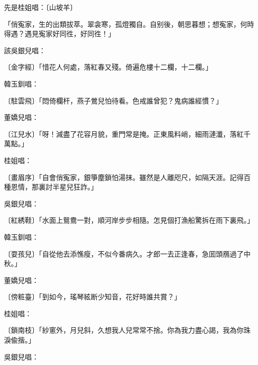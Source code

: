 先是桂姐唱：〔山坡羊〕
\begin{myquote}
「俏寃家，生的出類拔萃。翠衾寒，孤燈獨自。自别後，朝思暮想；想寃家，何時得遇？遇見寃家好同徃，好同徃！」
\end{myquote}

該吳銀兒唱：

\begin{myquote}
{\markfont〔金字經〕}「惜花人何處，落紅春又殘。倚遍危樓十二欄，十二欄。」
\end{myquote}

韓玉釧唱：

\begin{myquote}
{\markfont〔駐雲飛〕}「悶倚欄杆，燕子鶯兒怕待看。色戒誰曾犯？鬼病誰經慣？」
\end{myquote}

董嬌兒唱：

\begin{myquote}
{\markfont〔江兒水〕}「呀！減盡了花容月貌，重門常是掩。正東風料峭，細雨漣瀸，落紅千萬點。」
\end{myquote}

桂姐唱：

\begin{myquote}
{\markfont〔畫眉序〕}「自會俏寃家，銀箏塵鎖怕湯抹。雖然是人離咫尺，如隔天涯。記得百種恩情，那裏討半星兒狂詐。」
\end{myquote}

吳銀兒唱：

\begin{myquote}
{\markfont〔紅綉鞋〕}「水面上鴛鴦一對，順河岸步步相隨。怎見個打漁船驚拆在雨下裏飛。」
\end{myquote}

韓玉釧唱：

\begin{myquote}
{\markfont〔耍孩兒〕}「自從他去添憔瘦，不似今番病久。才郎一去正逢春，急囬頭鴈過了中秋。」
\end{myquote}

董嬌兒唱：

\begin{myquote}
{\markfont〔傍粧臺〕}「到如今，瑤琴絃断少知音，花好時誰共賞？」
\end{myquote}

桂姐唱：

\begin{myquote}
{\markfont〔鎖南枝〕}「紗窻外，月兒斜，久想我人兒常常不捨。你為我力盡心謁，我為你珠淚偸揩。」
\end{myquote}

吳銀兒唱：

